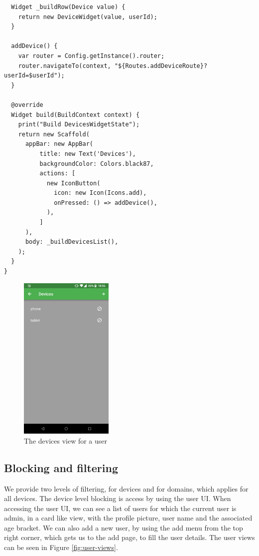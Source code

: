 \begin{lstlisting}
  Widget _buildRow(Device value) {
    return new DeviceWidget(value, userId);
  }

  addDevice() {
    var router = Config.getInstance().router;
    router.navigateTo(context, "${Routes.addDeviceRoute}?userId=$userId");
  }

  @override
  Widget build(BuildContext context) {
    print("Build DevicesWidgetState");
    return new Scaffold(
      appBar: new AppBar(
          title: new Text('Devices'),
          backgroundColor: Colors.black87,
          actions: [
            new IconButton(
              icon: new Icon(Icons.add),
              onPressed: () => addDevice(),
            ),
          ]
      ),
      body: _buildDevicesList(),
    );
  }
}
\end{lstlisting}

\begin{figure}[th]
\centering
\includegraphics[width=0.4\textwidth]{Figures/devices}
\decoRule
\caption{The devices view for a user}
\label{fig:user-devices}
\end{figure}

\subsection{Blocking and filtering}

We provide two levels of filtering, for devices and for domains, which applies for all devices. The device level blocking is access by using the user UI. When accessing the user UI, we can see a list of users for which the current user is admin, in a card like view, with the profile picture, user name and the associated age bracket. We can also add a new user, by using the add menu from the top right corner, which gets us to the add page, to fill the user details. The user views can be seen in Figure \ref{fig:user-views}.

